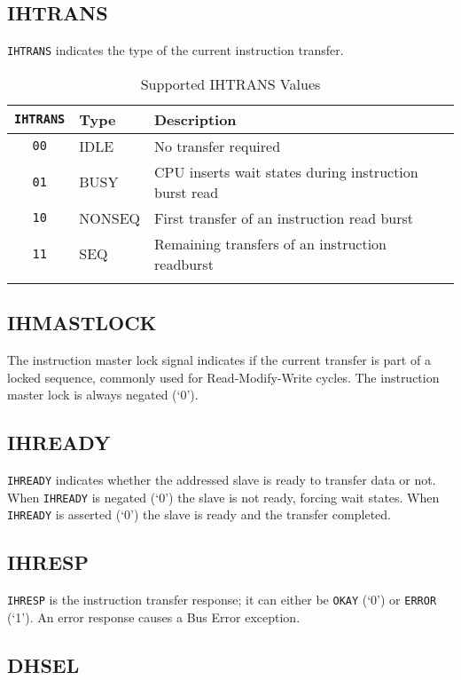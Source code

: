 \subsection{IHTRANS}\label{ihtrans}

\texttt{IHTRANS} indicates the type of the current instruction transfer.

\begin{longtable}[]{@{}cll@{}}
\toprule
\texttt{IHTRANS} & Type & Description\tabularnewline
\midrule
\endhead
\texttt{00} & IDLE   & No transfer required\tabularnewline
\texttt{01} & BUSY   & CPU inserts wait states during instruction burst read\tabularnewline
\texttt{10} & NONSEQ & First transfer of an instruction read burst\tabularnewline
\texttt{11} & SEQ    & Remaining transfers of an instruction readburst\tabularnewline
\bottomrule
\caption{Supported IHTRANS Values}
\label{tab:ihtrans-values}
\end{longtable}

\subsection{IHMASTLOCK}\label{ihmastlock}

The instruction master lock signal indicates if the current transfer is
part of a locked sequence, commonly used for Read-Modify-Write cycles.
The instruction master lock is always negated (`0').

\subsection{IHREADY}\label{ihready}

\texttt{IHREADY} indicates whether the addressed slave is ready to transfer data
or not. When \texttt{IHREADY} is negated (`0') the slave is not ready, forcing
wait states. When \texttt{IHREADY} is asserted (`0') the slave is ready and the
transfer completed.

\subsection{IHRESP}\label{ihresp}

\texttt{IHRESP} is the instruction transfer response; it can either be \texttt{OKAY} (`0')
or \texttt{ERROR} (`1'). An error response causes a Bus Error exception.

\subsection{DHSEL}\label{dhsel}

